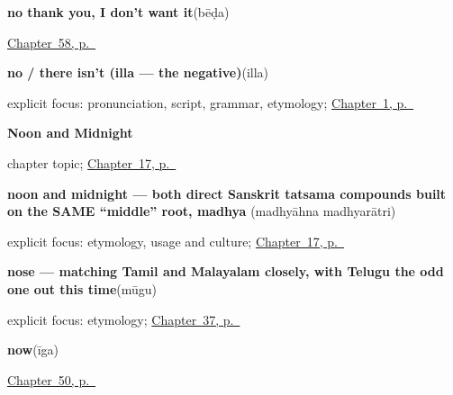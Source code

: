 \noindent\begin{minipage}[t]{\linewidth}
\raggedright
\textbf{no thank you, I don't want it}\enspace\emph{}\enspace(bēḍa)\par
\footnotesize \hyperref[ch:ka-more-replies]{Chapter~58, p.~\pageref*{ch:ka-more-replies}}
\end{minipage}\par\smallskip

\noindent\begin{minipage}[t]{\linewidth}
\raggedright
\textbf{no / there isn't (illa — the negative)}\enspace\emph{}\enspace(illa)\par
\footnotesize explicit focus: pronunciation, script, grammar, etymology; \hyperref[ch:greetings]{Chapter~1, p.~\pageref*{ch:greetings}}
\end{minipage}\par\smallskip

\noindent\begin{minipage}[t]{\linewidth}
\raggedright
\textbf{Noon and Midnight}\par
\footnotesize chapter topic; \hyperref[ch:ka-noon-and-midnight]{Chapter~17, p.~\pageref*{ch:ka-noon-and-midnight}}
\end{minipage}\par\smallskip

\noindent\begin{minipage}[t]{\linewidth}
\raggedright
\textbf{noon and midnight — both direct Sanskrit tatsama compounds built on the SAME \textquotedblleft{}middle\textquotedblright{} root, madhya}\enspace\emph{ }\enspace(madhyāhna madhyarātri)\par
\footnotesize explicit focus: etymology, usage and culture; \hyperref[ch:ka-noon-and-midnight]{Chapter~17, p.~\pageref*{ch:ka-noon-and-midnight}}
\end{minipage}\par\smallskip

\noindent\begin{minipage}[t]{\linewidth}
\raggedright
\textbf{nose — matching Tamil and Malayalam closely, with Telugu the odd one out this time}\enspace\emph{}\enspace(mūgu)\par
\footnotesize explicit focus: etymology; \hyperref[ch:ka-face-words]{Chapter~37, p.~\pageref*{ch:ka-face-words}}
\end{minipage}\par\smallskip

\noindent\begin{minipage}[t]{\linewidth}
\raggedright
\textbf{now}\enspace\emph{}\enspace(īga)\par
\footnotesize \hyperref[ch:ka-leave-more]{Chapter~50, p.~\pageref*{ch:ka-leave-more}}
\end{minipage}\par\smallskip

